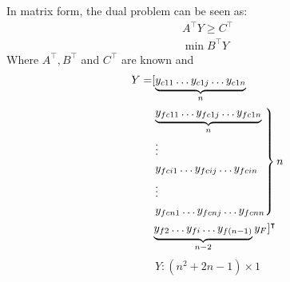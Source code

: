 In matrix form, the dual problem can be seen as:
\begin{equation*}
\begin{gathered}
  A^\intercal Y \geq C^\intercal \\
  \min{B^\intercal Y}
\end{gathered}
\end{equation*}
Where $A^\intercal, B^\intercal$ and $C^\intercal$ are known and
\begin{align*}
  Y = &[\underbrace{y_{c11} \dots y_{c1j} \dots y_{c1n}}_{n} \\
    &\begin{rcases}
      \underbrace{y_{fc11} \dots y_{fc1j} \dots y_{fc1n}}_{n} \\
      \vdots \\
      y_{fci1} \dots y_{fcij} \dots y_{fcin} \\
      \vdots \\
      y_{fcn1} \dots y_{fcnj} \dots y_{fcnn}
    \end{rcases} n \\
    &\underbrace{y_{f2} \dots y_{fi} \dots y_{f\left(n-1\right)}}_{n-2} y_F ]^\intercal
\end{align*}
\begin{equation*}
  Y : \left(n^2 + 2n - 1\right) \times 1
\end{equation*}

